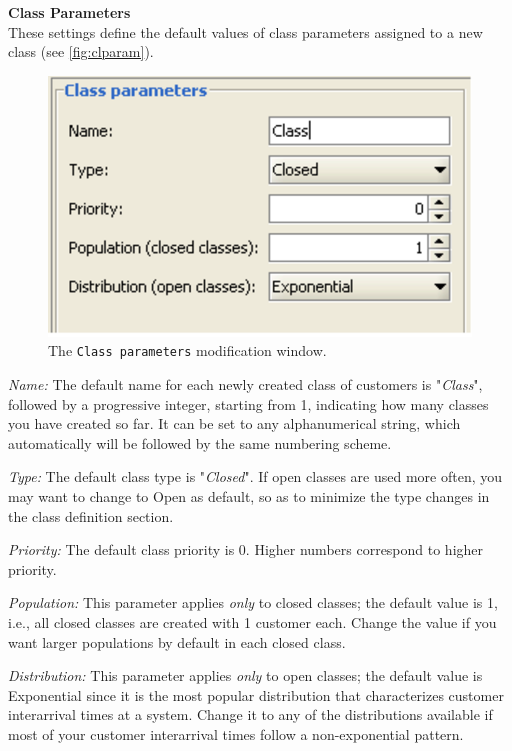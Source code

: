 \noindent \textbf{Class Parameters}\\
These settings define the default values of class parameters
assigned to a new class (see \autoref{fig:clparam}).
\begin{figure}[htb]
    \begin{center}
        \includegraphics[scale=.5]{img/jsimg/9.2.eps}
    \end{center}
    \caption{The \texttt{Class parameters} modification window.}
    \label{fig:clparam}
\end{figure}
\begin{itemize*}
\item \emph{Name:} The default name for each newly created class
of customers is "\emph{Class}", followed by a progressive integer,
starting from 1, indicating how many classes you have created so
far. It can be set to any alphanumerical string, which
automatically will be followed by the same numbering scheme. \item
\emph{Type:} The default class type is "\emph{Closed}". If open
classes are used more often, you may want to change to Open as
default, so as to minimize the type changes in the class
definition section. \item \emph{Priority:} The default class
priority is 0. Higher numbers correspond to higher priority. \item
\emph{Population:} This parameter applies \emph{only} to closed
classes; the default value is 1, i.e., all closed classes are
created with 1 customer each. Change the value if you want larger
populations by default in each closed class. \item
\emph{Distribution:} This parameter applies \emph{only} to open
classes; the default value is Exponential since it is the most
popular distribution that characterizes customer interarrival
times at a system. Change it to any of the distributions available
if most of your customer interarrival times follow a
non-exponential pattern.
\end{itemize*}

